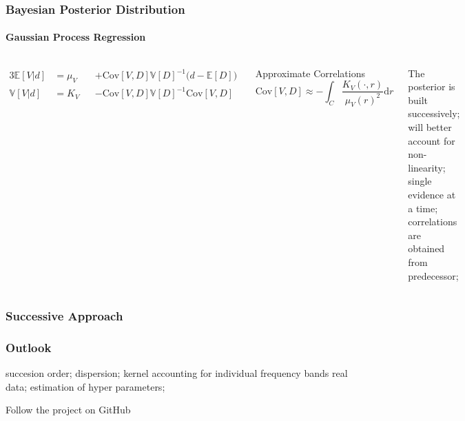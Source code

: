 \documentclass[aspectratio=169, t, 10pt]{beamer}
\newcommand\Mean[1]{\mathbb{E}\!\left[#1\right]}
\newcommand\Var[1]{\mathbb{V}\!\left[#1\right]}
\newcommand\Cov[2]{\mathrm{Cov}\!\left[#1,#2\right]}
\begin{document}
\begin{frame}
    \frametitle{Bayesian Posterior Distribution}
    \framesubtitle{Gaussian Process Regression}

\begin{columns}
    \begin{alignat}{3}
        \Mean{V|d} &= \mu_V &&+ \Cov{V}{D} \Var{D}^{-1} \big( d - \Mean{D} \big)
        \\
        \Var{V|d}  &= K_V   &&- \Cov{V}{D} \Var{D}^{-1} \Cov{V}{D}
    \end{alignat}

    Approximate Correlations
    \begin{equation}
        \Cov{V}{D} \approx -\int_C \frac {K_V(\cdot,r)}{\mu_V(r)^2} \mathrm d r
    \end{equation}

    The posterior is built successively;
    will better account for non-linearity;
    single evidence at a time;
    correlations are obtained from predecessor;


    \vspace{-15mm}
    

\end{columns}

\end{frame}


\begin{frame}
    \frametitle{Successive Approach}
    \begin{center}
    \end{center}
\end{frame}


\begin{frame}
    \frametitle{Outlook}

    succesion order;
    dispersion;
    kernel accounting for individual frequency bands
    real data;
    estimation of hyper parameters;

\end{frame}

\begin{frame}
    \hspace{15mm} Follow the project on GitHub \\[1cm]
    \hfill {} \hspace{20mm}
\end{frame}
\end{document}
